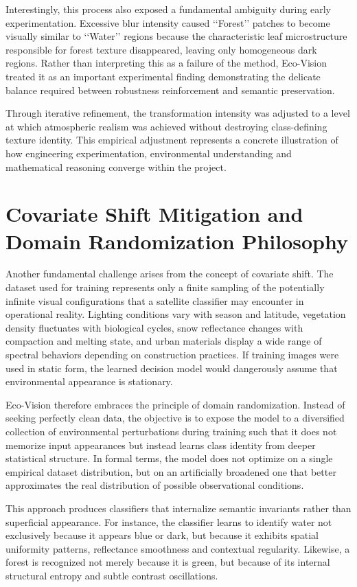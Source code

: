 \documentclass[12pt,a4paper]{report}
\begin{document}
Interestingly, this process also exposed a fundamental ambiguity during early experimentation. Excessive blur intensity caused ‘‘Forest’’ patches to become visually similar to ‘‘Water’’ regions because the characteristic leaf microstructure responsible for forest texture disappeared, leaving only homogeneous dark regions. Rather than interpreting this as a failure of the method, Eco-Vision treated it as an important experimental finding demonstrating the delicate balance required between robustness reinforcement and semantic preservation.

Through iterative refinement, the transformation intensity was adjusted to a level at which atmospheric realism was achieved without destroying class-defining texture identity. This empirical adjustment represents a concrete illustration of how engineering experimentation, environmental understanding and mathematical reasoning converge within the project.

\section{Covariate Shift Mitigation and Domain Randomization Philosophy}

Another fundamental challenge arises from the concept of covariate shift. The dataset used for training represents only a finite sampling of the potentially infinite visual configurations that a satellite classifier may encounter in operational reality. Lighting conditions vary with season and latitude, vegetation density fluctuates with biological cycles, snow reflectance changes with compaction and melting state, and urban materials display a wide range of spectral behaviors depending on construction practices. If training images were used in static form, the learned decision model would dangerously assume that environmental appearance is stationary.

Eco-Vision therefore embraces the principle of domain randomization. Instead of seeking perfectly clean data, the objective is to expose the model to a diversified collection of environmental perturbations during training such that it does not memorize input appearances but instead learns class identity from deeper statistical structure. In formal terms, the model does not optimize on a single empirical dataset distribution, but on an artificially broadened one that better approximates the real distribution of possible observational conditions.

This approach produces classifiers that internalize semantic invariants rather than superficial appearance. For instance, the classifier learns to identify water not exclusively because it appears blue or dark, but because it exhibits spatial uniformity patterns, reflectance smoothness and contextual regularity. Likewise, a forest is recognized not merely because it is green, but because of its internal structural entropy and subtle contrast oscillations.
\end{document}
